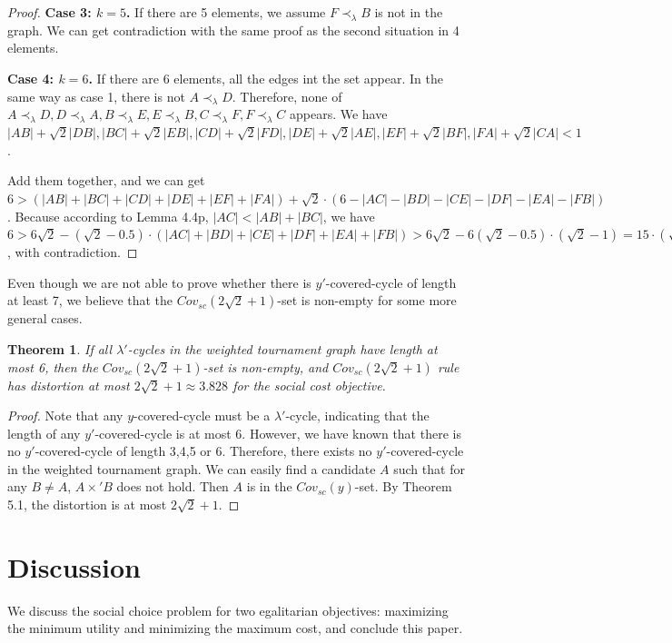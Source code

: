 \documentclass[11pt]{article}
\newtheorem{theorem}{Theorem}[section]
\theoremstyle{remark}
\begin{document}
\begin{proof}
\noindent\textbf{Case 3: $k=5$.}
If there are 5 elements, we assume $F\prec_{\lambda} B$ is not in the graph. We can get contradiction with the same proof as the second situation in 4 elements.

\noindent\textbf{Case 4: $k=6$.}
If there are 6 elements, all the edges int the set appear. In the same way as case 1, there is not $A\prec_{\lambda}D$. Therefore, none of $A\prec_{\lambda}D,D\prec_{\lambda}A,B\prec_{\lambda}E,E\prec_{\lambda}B,C\prec_{\lambda}F,F\prec_{\lambda}C$ appears. We have
$|AB|+\sqrt2|DB|,|BC|+\sqrt2|EB|,|CD|+\sqrt2|FD|,|DE|+\sqrt2|AE|,|EF|+\sqrt2|BF|,|FA|+\sqrt2|CA|<1$.

Add them together, and we can get
$ 6 > (|AB|+|BC|+|CD|+|DE|+|EF|+|FA|) + \sqrt2\cdot (6-|AC|-|BD|-|CE|-|DF|-|EA|-|FB|) $.
Because according to Lemma 4.4p, $|AC|<|AB|+|BC|$, we have
$6>6\sqrt2-(\sqrt2-0.5)\cdot (|AC|+|BD|+|CE|+|DF|+|EA|+|FB|)>6\sqrt2-6(\sqrt2-0.5)\cdot(\sqrt2-1)=15\cdot (\sqrt2-1)>6$, with contradiction.
\end{proof}

Even though we are not able to prove whether there is $y'$-covered-cycle of length at least 7, we believe that the $Cov_{sc}(2\sqrt2+1)$-set is non-empty for some more general cases.

\begin{theorem}
 If all $\lambda'$-cycles in the weighted tournament graph have length at most 6, then the $Cov_{sc}(2\sqrt2+1)$-set is non-empty, and $Cov_{sc}(2\sqrt2+1)$ rule has distortion at most $2\sqrt2+1\approx 3.828$ for the social cost objective.
\end{theorem}

\begin{proof}
Note that any $y$-covered-cycle must be a $\lambda'$-cycle, indicating that the length of any $y'$-covered-cycle is at most 6. However, we have known that there is no $y'$-covered-cycle of length 3,4,5 or 6. Therefore, there exists no $y'$-covered-cycle in the weighted tournament graph. We can easily find a candidate $A$ such that for any $B\neq A$, $A\times' B$ does not hold. Then $A$ is in the $Cov_{sc}(y)$-set. By Theorem 5.1, the distortion is at most $2\sqrt2+1$.
 \end{proof}

\section{Discussion} \label{sec:dis}
We discuss the social choice problem for two egalitarian objectives: maximizing the minimum utility and minimizing the maximum cost, and conclude this paper.
\end{document}
